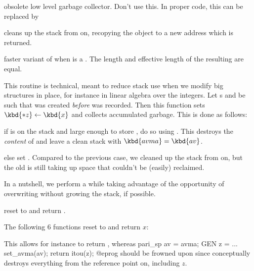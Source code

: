  obsolete low level garbage
collector. Don't use this. In proper code, this can be replaced by

 cleans up the stack from
 on, recopying the object  to a new address which is
returned.

 faster variant of  when
 is a . The length and effective length of the resulting
 are equal.

 This routine is technical,
meant to reduce stack use when we modify big structures in place, for
instance in linear algebra over the integers. Let s 
and  be such that  was created \emph{before}  was
recorded. Then this function sets $\kbd{*z} \leftarrow \kbd{x}$ and collects
accumulated garbage. This is done as follows:

\item if  is on the stack and large enough to store , do so
using . This destroys the \emph{content} of  and leave a
clean stack with $\kbd{avma} = \kbd{av}$.

\item else set . Compared to the previous case,
we cleaned up the stack from  on, but the old  is still
taking up space that couldn't be (easily) reclaimed.

In a nutshell, we perform a  while taking advantage of the
opportunity of overwriting  without growing the stack, if possible.

 reset  to  and return
.

The following 6 functions reset  to  and return $x$:





 This allows for instance
to return , whereas
\bprog
  pari_sp av = avma;
  GEN z = ...
  set_avma(av);
  return itou(z);
@eprog should be frowned upon since  conceptually
destroys everything from the reference point on, including $z$.


